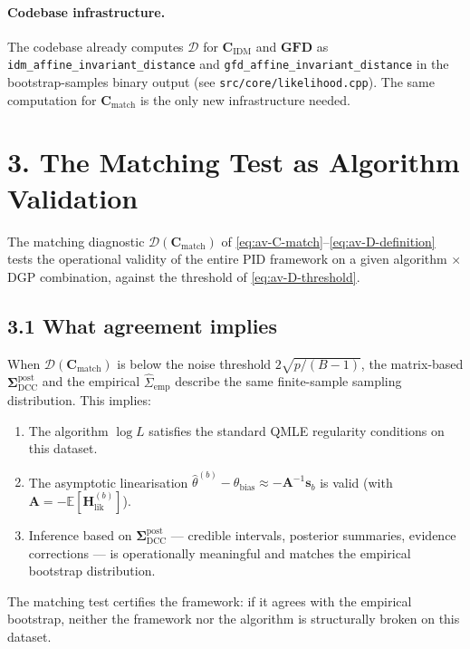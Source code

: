 \documentclass[11pt]{article}
\begin{document}
\paragraph{Codebase infrastructure.}
The codebase already computes $\mathcal D$ for
$\mathbf C_{\mathrm{IDM}}$ and $\mathbf{GFD}$ as
\texttt{idm\_affine\_invariant\_distance} and
\texttt{gfd\_affine\_invariant\_distance} in the bootstrap-samples
binary output (see \texttt{src/core/likelihood.cpp}). The same
computation for $\mathbf C_{\mathrm{match}}$ is the only new
infrastructure needed.

\section*{3. The Matching Test as Algorithm Validation}
\label{sec:av-matching-test}

The matching diagnostic $\mathcal D(\mathbf C_{\mathrm{match}})$
of \eqref{eq:av-C-match}--\eqref{eq:av-D-definition} tests the
operational validity of the entire PID framework on a given algorithm
$\times$ DGP combination, against the threshold of
\eqref{eq:av-D-threshold}.

\subsection*{3.1 What agreement implies}

When $\mathcal D(\mathbf C_{\mathrm{match}})$ is below the noise
threshold $2\sqrt{p/(B-1)}$, the matrix-based
$\boldsymbol\Sigma_{\mathrm{DCC}}^{\mathrm{post}}$ and the empirical
$\widehat\Sigma_{\mathrm{emp}}$ describe the same finite-sample
sampling distribution. This implies:

\begin{enumerate}
\item The algorithm $\log L$ satisfies the standard QMLE regularity
  conditions on this dataset.
\item The asymptotic linearisation
  $\widehat\theta^{(b)} - \theta_{\mathrm{bias}} \approx -\mathbf A^{-1}\mathbf s_b$
  is valid (with $\mathbf A = -\mathbb E[\mathbf H_{\mathrm{lik}}^{(b)}]$).
\item Inference based on $\boldsymbol\Sigma_{\mathrm{DCC}}^{\mathrm{post}}$
  --- credible intervals, posterior summaries, evidence corrections ---
  is operationally meaningful and matches the empirical bootstrap
  distribution.
\end{enumerate}

The matching test certifies the framework: if it agrees with the empirical
bootstrap, neither the framework nor the algorithm is structurally
broken on this dataset.
\end{document}
